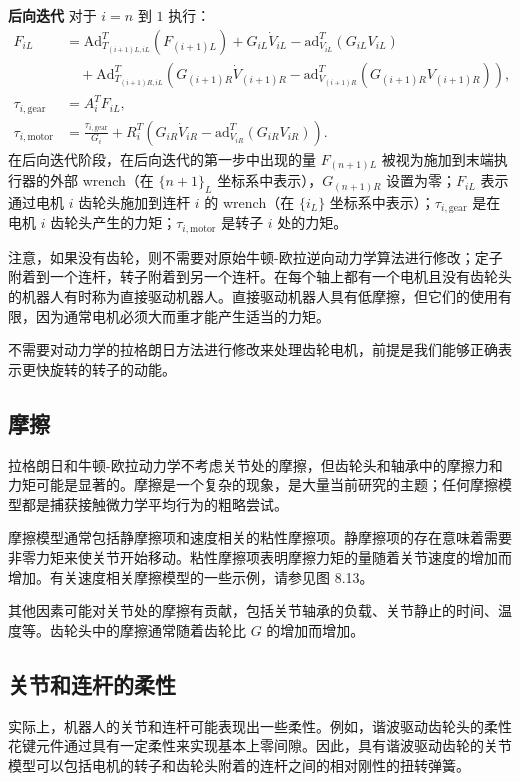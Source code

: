 \documentclass[12pt,a4paper]{article}
\begin{document}
\textbf{后向迭代} 对于 $i = n$ 到 $1$ 执行：
\begin{align}
F_{iL} &= \text{Ad}_{T_{(i+1)L,iL}}^T(F_{(i+1)L}) + G_{iL}\dot{V}_{iL} - \text{ad}_{V_{iL}}^T(G_{iL}V_{iL}) \nonumber \\
&\quad + \text{Ad}_{T_{(i+1)R,iL}}^T(G_{(i+1)R}\dot{V}_{(i+1)R} - \text{ad}_{V_{(i+1)R}}^T(G_{(i+1)R}V_{(i+1)R})), \label{eq:8.109} \\
\tau_{i,\text{gear}} &= A_i^T F_{iL}, \label{eq:8.110} \\
\tau_{i,\text{motor}} &= \frac{\tau_{i,\text{gear}}}{G_i} + R_i^T(G_{iR}\dot{V}_{iR} - \text{ad}_{V_{iR}}^T(G_{iR}V_{iR})). \label{eq:8.111}
\end{align}
在后向迭代阶段，在后向迭代的第一步中出现的量 $F_{(n+1)L}$ 被视为施加到末端执行器的外部 wrench（在 $\{n+1\}_L$ 坐标系中表示），$G_{(n+1)R}$ 设置为零；$F_{iL}$ 表示通过电机 $i$ 齿轮头施加到连杆 $i$ 的 wrench（在 $\{i_L\}$ 坐标系中表示）；$\tau_{i,\text{gear}}$ 是在电机 $i$ 齿轮头产生的力矩；$\tau_{i,\text{motor}}$ 是转子 $i$ 处的力矩。

注意，如果没有齿轮，则不需要对原始牛顿-欧拉逆向动力学算法进行修改；定子附着到一个连杆，转子附着到另一个连杆。在每个轴上都有一个电机且没有齿轮头的机器人有时称为直接驱动机器人。直接驱动机器人具有低摩擦，但它们的使用有限，因为通常电机必须大而重才能产生适当的力矩。

不需要对动力学的拉格朗日方法进行修改来处理齿轮电机，前提是我们能够正确表示更快旋转的转子的动能。

\subsection{摩擦}
拉格朗日和牛顿-欧拉动力学不考虑关节处的摩擦，但齿轮头和轴承中的摩擦力和力矩可能是显著的。摩擦是一个复杂的现象，是大量当前研究的主题；任何摩擦模型都是捕获接触微力学平均行为的粗略尝试。

摩擦模型通常包括静摩擦项和速度相关的粘性摩擦项。静摩擦项的存在意味着需要非零力矩来使关节开始移动。粘性摩擦项表明摩擦力矩的量随着关节速度的增加而增加。有关速度相关摩擦模型的一些示例，请参见图 8.13。

其他因素可能对关节处的摩擦有贡献，包括关节轴承的负载、关节静止的时间、温度等。齿轮头中的摩擦通常随着齿轮比 $G$ 的增加而增加。

\subsection{关节和连杆的柔性}
实际上，机器人的关节和连杆可能表现出一些柔性。例如，谐波驱动齿轮头的柔性花键元件通过具有一定柔性来实现基本上零间隙。因此，具有谐波驱动齿轮的关节模型可以包括电机的转子和齿轮头附着的连杆之间的相对刚性的扭转弹簧。
\end{document}
